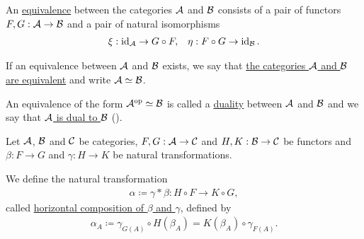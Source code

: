\begin{definition}\label{def:category_equivalence}\cite[definition 1.3.15]{Leinster2014}
  An \uline{equivalence} between the categories $\mathcal A$ and $\mathcal B$ consists of a pair of functors $F, G: \mathcal A \to \mathcal B$ and a pair of natural isomorphisms
  \begin{align*}
    \xi: \operatorname{id}_{\mathcal A} \to G \circ F,
    &&
    \eta: F \circ G \to \operatorname{id}_{\mathcal B}.
  \end{align*}

  If an equivalence between $\mathcal A$ and $\mathcal B$ exists, we say that \uline{the categories $\mathcal A$ and $\mathcal B$ are equivalent} and write $\mathcal A \simeq \mathcal B$.

  An equivalence of the form $\mathcal A^{\operatorname{op}} \simeq \mathcal B$ is called a \uline{duality} between $\mathcal A$ and $\mathcal B$ and we say that \uline{$\mathcal A$ is dual to $\mathcal B$} (\cite[example 1.3.22]{Leinster2014}).
\end{definition}

\begin{definition}\label{def:natural_transformation_horizontal_composition}\cite[remarks 1.3.24]{Leinster2014}
  Let $\mathcal A$, $\mathcal B$ and $\mathcal C$ be categories, $F, G: \mathcal A \to \mathcal C$ and $H, K: \mathcal B \to \mathcal C$ be functors and $\beta: F \to G$ and $\gamma: H \to K$ be natural transformations.
  \begin{center}
  \end{center}

  We define the natural transformation
  \begin{align*}
    \alpha \coloneqq \gamma * \beta: H \circ F \to K \circ G,
  \end{align*}
  called \uline{horizontal composition of $\beta$ and $\gamma$}, defined by
  \begin{align*}
    \alpha_A \coloneqq \gamma_{G(A)} \circ H(\beta_A) = K(\beta_A) \circ \gamma_{F(A)}.
  \end{align*}
\end{definition}

